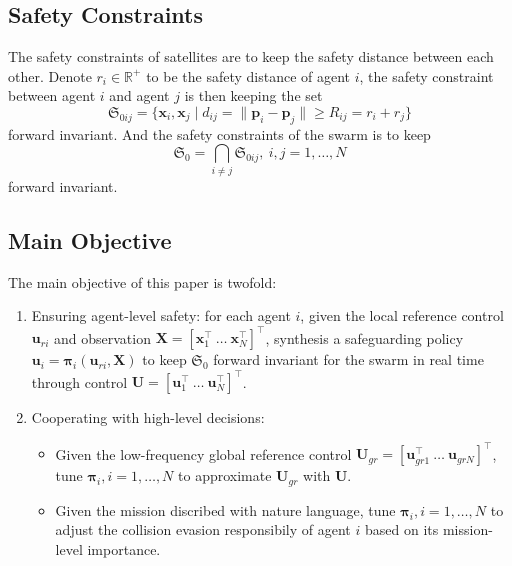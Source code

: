 \documentclass{ifacconf}
\begin{document}
\subsection{Safety Constraints}
\par The safety constraints of satellites are to keep the safety distance between each other. 
Denote $r_i \in \mathbb{R}^+$ to be the safety distance of agent $i$, the safety constraint between agent $i$ and agent $j$ is then keeping the set
\begin{equation}
   \mathfrak{S}_{0ij} = \{\boldsymbol{x}_i, \boldsymbol{x}_j \mid d_{ij} = \| \boldsymbol{p}_i - \boldsymbol{p}_j \| \ge R_{ij} = r_i + r_j \}
\end{equation}
forward invariant. 
And the safety constraints of the swarm is to keep 
\begin{equation}
   \mathfrak{S}_0 = \bigcap_{i \neq j}\mathfrak{S}_{0ij}, ~i,j = 1, \dots, N
\end{equation}
forward invariant.

\subsection{Main Objective}
\par The main objective of this paper is twofold:
\begin{enumerate}[label=\arabic*)]
   \item Ensuring agent-level safety: for each agent $i$, given the local reference control $\boldsymbol{u}_{ri}$ and observation $\boldsymbol{X} = [\boldsymbol{x}_1^{\top}~\dots~\boldsymbol{x}_N^{\top}]^{\top}$, synthesis a safeguarding policy $\boldsymbol{u}_i = \boldsymbol{\pi}_{i}(\boldsymbol{u}_{ri}, \boldsymbol{X})$ to keep $\mathfrak{S}_0$ forward invariant for the swarm in real time through control $\boldsymbol{U} = [\boldsymbol{u}_1^\top~\dots~\boldsymbol{u}_N^\top]^\top$.
   \item Cooperating with high-level decisions: 
      \begin{itemize}
         \item Given the low-frequency global reference control $\boldsymbol{U}_{gr} = [\boldsymbol{u}_{gr1}^{\top}~\dots~\boldsymbol{u}_{grN}]^\top$, tune $\boldsymbol{\pi}_i, i = 1, \dots, N$ to approximate $\boldsymbol{U}_{gr}$ with $\boldsymbol{U}$.
         \item Given the mission discribed with nature language, tune $\boldsymbol{\pi}_i, i = 1, \dots, N$ to adjust the collision evasion responsibily of agent $i$ based on its mission-level importance. 
      \end{itemize}
\end{enumerate}
\end{document}
